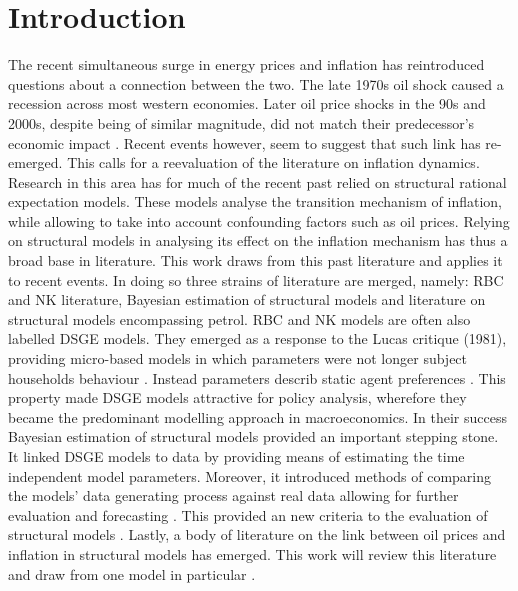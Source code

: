 \documentclass[12pt,a4paper,english]{article} %
\let\oldsection\section
\renewcommand\section{\clearpage\oldsection}
\begin{document}
	
	 \section{Introduction}
	 The recent simultaneous surge in energy prices and inflation has reintroduced questions about a connection between the two. The late 1970s oil shock caused a recession across most western economies. Later oil price shocks in the 90s and 2000s, despite being of similar magnitude, did not match their predecessor's economic impact \cite{blanchard_macroeconomic_2007}. Recent events however, seem to suggest that such link has re-emerged. This calls for a reevaluation of the literature on inflation dynamics. Research in this area has for much of the recent past relied on structural rational expectation models. These models analyse the transition mechanism of inflation, while allowing to take into account confounding factors such as oil prices. Relying on structural models in analysing its effect on the inflation mechanism has thus a broad base in literature. This work draws from this past literature and applies it to recent events. In doing so three strains of literature are merged, namely: \ac{RBC} and \ac{NK} literature, Bayesian estimation of structural models and literature on structural models encompassing petrol. \ac{RBC} and \ac{NK} models are often also labelled \ac{DSGE} models. They emerged as a response to the Lucas critique (1981), providing micro-based models in which parameters were not longer subject households behaviour \cite{lucas_jr_tobin_1981}. Instead parameters describ static agent preferences \cite{gali_monetary_2008}. This property made DSGE models attractive for policy analysis, wherefore they became the predominant modelling approach in macroeconomics. In their success Bayesian estimation of structural models provided an important stepping stone. It linked \ac{DSGE} models to data by providing means of estimating the time independent model parameters. Moreover, it introduced methods of comparing the models' data generating process against real data allowing for further evaluation and forecasting \cite{del_negro_forming_2008}. This provided an new criteria to the evaluation of structural models \cite{kocherlakota_model_2007}. Lastly, a body of literature on the link between oil prices and inflation in structural models has emerged. This work will review this literature and draw from one model in particular \cite{blanchard_macroeconomic_2007}. 
	 
\end{document}
